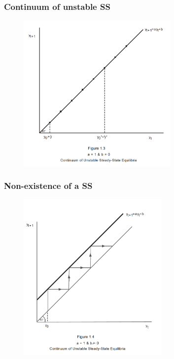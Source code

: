 \documentclass[11pt]{beamer}
\begin{document}

\begin{frame}
\frametitle{Continuum of unstable SS}
{\begin{figure}
\centering
\includegraphics[width = 0.7\textwidth]{./images/fig3}
\end{figure}}
\end{frame}


\begin{frame}
\frametitle{Non-existence of a SS}
{\begin{figure}
\centering
\includegraphics[width = 0.66\textwidth]{./images/fig4}
\end{figure}}
\end{frame}
\end{document}
